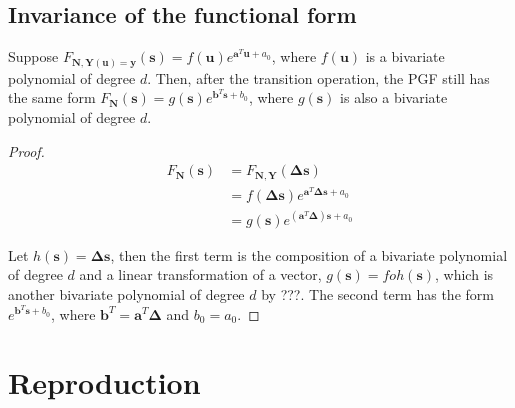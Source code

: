 \documentclass{article}
\begin{document}
\subsection{Invariance of the functional form}
Suppose $F_{\mathbf{N}, \mathbf{Y}(\mathbf{u}) = \mathbf{y}}(\mathbf{s}) = f(\mathbf{u}) e^{\mathbf{a}^T \mathbf{u} + a_0}$, where $f(\mathbf{u})$ is a bivariate polynomial of degree $d$. Then, after the transition operation, the PGF still has the same form $F_{\mathbf{N}}(\mathbf{s}) = g(\mathbf{s}) e^{\mathbf{b}^T \mathbf{s} + b_0}$, where $g(\mathbf{s})$ is also a bivariate polynomial of degree $d$.

\begin{proof}
\begin{align*}
F_{\mathbf{N}}(\mathbf{s}) &=  F_{\mathbf{N}, \mathbf{Y}}(\mathbf{\Delta} \mathbf{s}) \\
&= f(\mathbf{\Delta} \mathbf{s}) e^{\mathbf{a}^T \mathbf{\mathbf{\Delta} \mathbf{s}} + a_0} \\
&= g(\mathbf{s}) e^{(\mathbf{a}^T \mathbf{\Delta}) \mathbf{s} + a_0}
\end{align*}

Let $h(\mathbf{s}) = \mathbf{\Delta} \mathbf{s}$, then the first term is the composition of a bivariate polynomial of degree $d$ and a linear transformation of a vector, $g(\mathbf{s}) = f o h(\mathbf{s})$, which is another bivariate polynomial of degree $d$ by ???. The second term has the form $e^{\mathbf{b}^T \mathbf{s} + b_0}$, where $\mathbf{b}^T = \mathbf{a}^T \mathbf{\Delta}$ and $b_0 = a_0$.

\end{proof}

\section{Reproduction}
\end{document}
